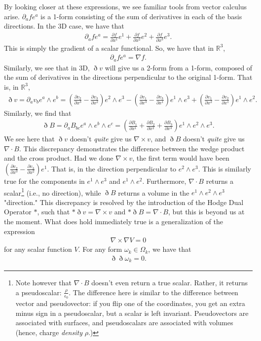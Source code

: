 \documentclass{book}
\begin{document}
By looking closer at these expressions, we see familiar tools from vector calculus arise. $\partial_a f e^a$ is a 1-form consisting of the sum of derivatives in each of the basis directions. In the 3D case, we have that \begin{gather}\partial_a f e^a = \frac{\partial f}{\partial x^1} e^1 + \frac{\partial f}{\partial x^2} e^2 + \frac{\partial f}{\partial x^3} e^3.\end{gather} This is simply the gradient of a scalar functional. So, we have that in $\mathbb{R}^3$, \begin{gather}\partial_a f e^a = \nabla f.\end{gather} Similarly, we see that in 3D, $\eth v$ will give us a 2-form from a 1-form, composed of the sum of derivatives in the directions perpendicular to the original 1-form. That is, in $\mathbb{R}^3$,\begin{gather}\eth v = \partial_a v_b e^a\wedge e^b = (\frac{\partial v_2}{\partial x^3} - \frac{\partial v_3}{\partial x^2})e^2\wedge e^3 - (\frac{\partial v_1}{\partial x^3} - \frac{\partial v_3}{\partial x^1})e^1 \wedge e^3 + (\frac{\partial v_1}{\partial x^2} - \frac{\partial v_2}{\partial x^1})e^1 \wedge e^2.\end{gather} Similarly, we find that \begin{gather} \eth B = \partial_a B_{bc}e^a\wedge e^b\wedge e^c = (\frac{\partial B_1}{\partial x^1} + \frac{\partial B_2}{\partial x^2} + \frac{\partial B_3}{\partial x^3})e^1\wedge e^2 \wedge e^3.\end{gather} We see here that $\eth v$ doesn't \emph{quite} give us $\nabla \times v$, and $\eth B$ doesn't \emph{quite} give us $\nabla \cdot B$. This discrepancy demonstrates the difference between the wedge product and the cross product. Had we done $\nabla \times v$, the first term would have been $(\frac{\partial v_2}{\partial x^3} - \frac{\partial v_3}{\partial x^2})e^1$. That is, in the direction perpendicular to $e^2\wedge e^3$. This is similarly true for the components in $e^1\wedge e^3$ and $e^1 \wedge e^2$. Furthermore, $\nabla \cdot B$ returns a scalar\footnote{Note however that $\nabla \cdot B$ doesn't even return a true scalar. Rather, it returns a pseudoscalar: $\frac{\rho}{\epsilon_0}$. The difference here is similar to the difference between vector and pseudovector: if you flip one of the coordinates, you get an extra minus sign in a pseudoscalar, but a scalar is left invariant. Pseudovectors are associated with surfaces, and pseudoscalars are associated with volumes (hence, charge \textit{density} $\rho$.)} (i.e., no direction), while $\eth B$ returns a volume in the $e^1 \wedge e^2 \wedge e^3$ "direction." This discrepancy is resolved by the introduction of the Hodge Dual Operator $*$, such that $*\eth v = \nabla \times v$ and $*\eth B = \nabla \cdot B$, but this is beyond us at the moment. What does hold immediately true is a generalization of the expression \begin{gather} \nabla \times \nabla V = 0\end{gather} for any scalar function $V$. For any form $\omega_k \in \Omega_k$, we have that \begin{gather} \eth\eth\omega_k = 0.\end{gather}
\end{document}
